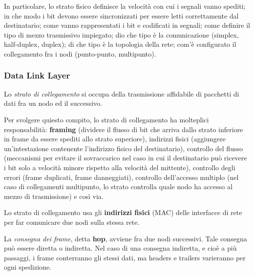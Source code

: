         \vspace{3mm}
        
        In particolare, lo strato fisico definisce la velocità con cui i segnali vanno spediti; in che modo i bit devono essere sincronizzati per essere letti correttamente dal destinatario; come vanno rappresentati i bit e codificati in segnali; come definire il tipo di mezzo trasmissivo impiegato; dio che tipo è la comunicazione (simplex, half-duplex, duplex); di che tipo è la topologia della rete; com'è configurato il collegamento fra i nodi (punto-punto, multipunto).
        
        \subsubsection{Data Link Layer}
        
            Lo \textit{strato di collegamento} si occupa della trasmissione affidabile di pacchetti di dati fra un nodo ed il successivo. 
            
            \vspace{3mm}
            
            Per svolgere quiesto compito, lo strato di collegamento ha molteplici responsabilità: \textbf{framing} (dividere il flusso di bit che arriva dallo strato inferiore in frame da essere spediti allo strato superiore), indirizzi fisici (aggiungere un'intestazione contenente l'indirizzo fisico del destinatario), controllo del flusso (meccanismi per evitare il sovraccarico nel caso in cui il destinatario può ricevere i bit solo a velocità minore rispetto alla velocità del mittente), controllo degli errori (frame duplicati, frame danneggiati), controllo dell'accesso multiplo (nel caso di collegamenti multipunto, lo strato controlla quale nodo ha accesso al mezzo di trasmissione) e così via.
            
            \vspace{3mm}
            
            Lo strato di collegamento usa gli \textbf{indirizzi fisici} (MAC) delle interfacce di rete per far comunicare due nodi sulla stessa rete.
            
            \vspace{3mm}
            
            La \textit{consegna dei frame}, detta \textbf{hop}, avviene fra due nodi successivi. Tale consegna può essere diretta o indiretta. Nel caso di una consegna indiretta, e cioè a più passaggi, i frame conterranno gli stessi dati, ma headers e trailers varieranno per ogni spedizione. 
            
